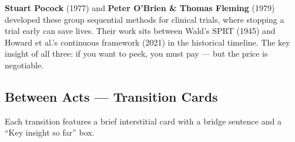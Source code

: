 \documentclass[12pt, a4paper]{article}
\begin{document}
\begin{historynote}
\textbf{Stuart Pocock} (1977) and \textbf{Peter O'Brien \& Thomas Fleming}
(1979) developed these group sequential methods for clinical trials, where
stopping a trial early can save lives.  Their work sits between Wald's SPRT
(1945) and Howard et al.'s continuous framework (2021) in the historical
timeline.  The key insight of all three: if you want to peek, you must pay
--- but the price is negotiable.
\end{historynote}

\subsection{Between Acts --- Transition Cards}

Each transition features a brief interstitial card with a bridge sentence and
a ``Key insight so far'' box.
\end{document}
